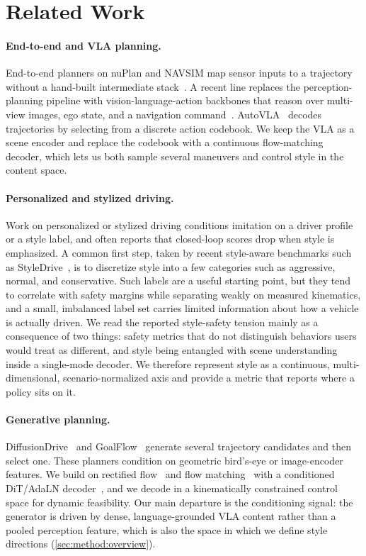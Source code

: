 \section{Related Work}
\label{sec:related}

\paragraph{End-to-end and VLA planning.}
End-to-end planners on nuPlan and NAVSIM map sensor inputs to a trajectory without
a hand-built intermediate stack~\cite{transfuser,navsim}. A recent line replaces the
perception-planning pipeline with vision-language-action backbones that reason over
multi-view images, ego state, and a navigation command~\cite{autovla,qwenvl}.
AutoVLA~\cite{autovla} decodes trajectories by selecting from a discrete action
codebook. We keep the VLA as a scene encoder and replace the codebook with a
continuous flow-matching decoder, which lets us both sample several maneuvers and
control style in the content space.

\paragraph{Personalized and stylized driving.}
Work on personalized or stylized driving conditions imitation on a driver profile or
a style label, and often reports that closed-loop scores drop when style is
emphasized. A common first step, taken by recent style-aware benchmarks such as
StyleDrive~\cite{styledrive}, is to discretize style into a few categories such as
aggressive, normal, and conservative. Such labels are a useful starting point, but
they tend to correlate with safety margins while separating weakly on measured
kinematics, and a small, imbalanced label set carries limited information about how a
vehicle is actually driven. We read the reported style-safety tension mainly as a
consequence of two things: safety metrics that do not distinguish behaviors users
would treat as different, and style being entangled with scene understanding inside a
single-mode decoder. We therefore represent style as a continuous, multi-dimensional,
scenario-normalized axis and provide a metric that reports where a policy sits on it.

\paragraph{Generative planning.}
DiffusionDrive~\cite{diffusiondrive} and GoalFlow~\cite{goalflow} generate several
trajectory candidates and then select one. These planners condition on geometric
bird's-eye or image-encoder features. We build on rectified flow~\cite{rectflow} and
flow matching~\cite{flowmatching} with a conditioned DiT/AdaLN
decoder~\cite{dit}, and we decode in a kinematically constrained control space for
dynamic feasibility. Our main departure is the conditioning signal: the generator is
driven by dense, language-grounded VLA content rather than a pooled perception
feature, which is also the space in which we define style directions
(\cref{sec:method:overview}).

